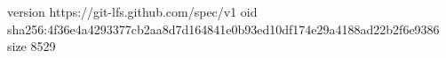 version https://git-lfs.github.com/spec/v1
oid sha256:4f36e4a4293377cb2aa8d7d164841e0b93ed10df174e29a4188ad22b2f6e9386
size 8529
